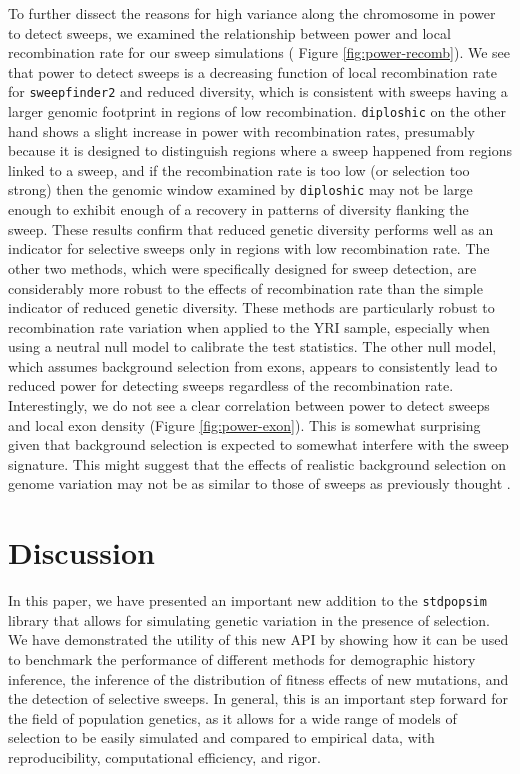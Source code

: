 \documentclass[hidelinks]{article}
\newcommand{\stdpopsim}{\texttt{stdpopsim}\xspace}
\newcommand{\sweepfinder}{\texttt{sweepfinder2}\xspace}
\newcommand{\diploshic}{\texttt{diploshic}\xspace}
\begin{document}
    To further dissect the reasons for high variance along the chromosome in power to detect sweeps,
    we examined the relationship between power and local recombination rate for our sweep simulations ( Figure \ref{fig:power-recomb}).
    We see that power to detect sweeps is
    a decreasing function of local recombination rate for \sweepfinder and reduced diversity,
    which is consistent with sweeps having a larger genomic footprint in regions of low
    recombination.
    \diploshic on the other hand shows a slight increase in power with recombination rates,
    presumably because it is designed to distinguish regions where a sweep happened from regions linked to a sweep,
    and if the recombination rate is too low (or selection too strong) then the genomic window examined by \diploshic may
    not be large enough to exhibit enough of a recovery in patterns of diversity flanking the sweep.
    These results confirm that reduced genetic diversity performs well as an indicator for selective sweeps only in regions with
    low recombination rate.
    The other two methods, which were specifically designed for sweep detection, are considerably more robust 
    to the effects of recombination rate than the simple indicator of reduced genetic diversity.
    These methods are particularly robust to recombination rate variation when applied to 
    the YRI sample, especially when using a neutral null model to calibrate the test statistics.
    The other null model, which assumes background selection from exons,
    appears to consistently lead to reduced power for detecting sweeps regardless of the recombination rate.
    Interestingly, we do not see a clear correlation between power to detect sweeps and
    local exon density (Figure \ref{fig:power-exon}).
    This is somewhat surprising given that background selection is expected to somewhat interfere with the sweep signature.
    This might suggest that the effects of realistic background selection on genome variation
    may not be as similar to those of sweeps as previously thought \citep{schrider2020background}.

\section*{Discussion}
    \label{Discussion}
    In this paper, we have presented an important new addition to the \stdpopsim{} library
    that allows for simulating genetic variation in the presence of selection.
    We have demonstrated the utility of this new API by showing how it can be used to benchmark
    the performance of different methods for demographic history inference, the inference of the distribution
    of fitness effects of new mutations, and the detection of selective sweeps.
    In general, this is an important step forward for the field of population genetics,
    as it allows for a wide range of models of selection to be easily simulated and compared to
    empirical data, with reproducibility, computational efficiency, and rigor.
\end{document}

